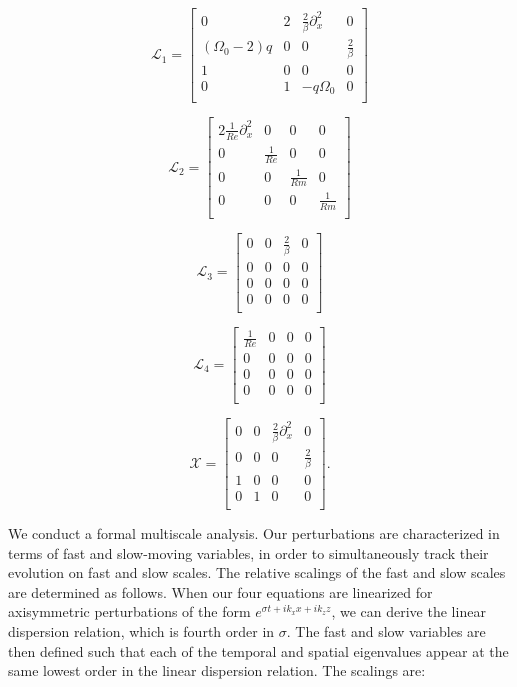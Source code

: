 \documentclass{emulateapj}
\newcommand{\beq}{\begin{equation}}
\newcommand{\eeq}{\end{equation}}
\newcommand\reye{\mathrel{Re}}
\newcommand\reym{\mathrel{Rm}}
\begin{document}
\beq
\mathcal{L}_1 = \left[\begin{matrix}
0 & 2 & \frac{2}{\beta}\partial_x^2 & 0 \\
(\Omega_0 - 2)q & 0 & 0 & \frac{2}{\beta} \\
1 & 0 & 0 & 0 \\
0 & 1 & -q\Omega_0 & 0 \\ \end{matrix}\right] 
\eeq

\beq
\mathcal{L}_2 = \left[\begin{matrix}
2\frac{1}{\reye} \partial_x^2 & 0 & 0 & 0 \\
0 & \frac{1}{\reye} & 0 & 0 \\
0 & 0 & \frac{1}{\reym} & 0 \\
0 & 0 & 0 & \frac{1}{\reym} \\ \end{matrix}\right]
\eeq

\beq
\mathcal{L}_3 = \left[\begin{matrix}
0 & 0 & \frac{2}{\beta} & 0 \\
0 & 0 & 0 & 0 \\
0 & 0 & 0 & 0 \\
0 & 0 & 0 & 0 \\ \end{matrix} \right]
\eeq

\beq
\mathcal{L}_4 = \left[\begin{matrix}
\frac{1}{\reye} & 0 & 0 & 0 \\
0 & 0 & 0 & 0 \\
0 & 0 & 0 & 0 \\
0 & 0 & 0 & 0 \\ \end{matrix}\right] 
\eeq

\beq
\mathcal{X} = \left[\begin{matrix}
0 & 0 & \frac{2}{\beta}\partial_x^2 & 0 \\
0 & 0 & 0 & \frac{2}{\beta} \\
1 & 0 & 0 & 0 \\
0 & 1 & 0 & 0 \\ \end{matrix} \right]. 
\eeq


We conduct a formal multiscale analysis. Our perturbations are characterized in terms of fast and slow-moving variables, in order to simultaneously track their evolution on fast and slow scales. The relative scalings of the fast and slow scales are determined as follows. When our four equations are linearized for axisymmetric perturbations of the form $e^{\sigma t + i k_x x + i k_z z}$, we can derive the linear dispersion relation, which is fourth order in $\sigma$. The fast and slow variables are then defined such that each of the temporal and spatial eigenvalues appear at the same lowest order in the linear dispersion relation. The scalings are: 
\end{document}
